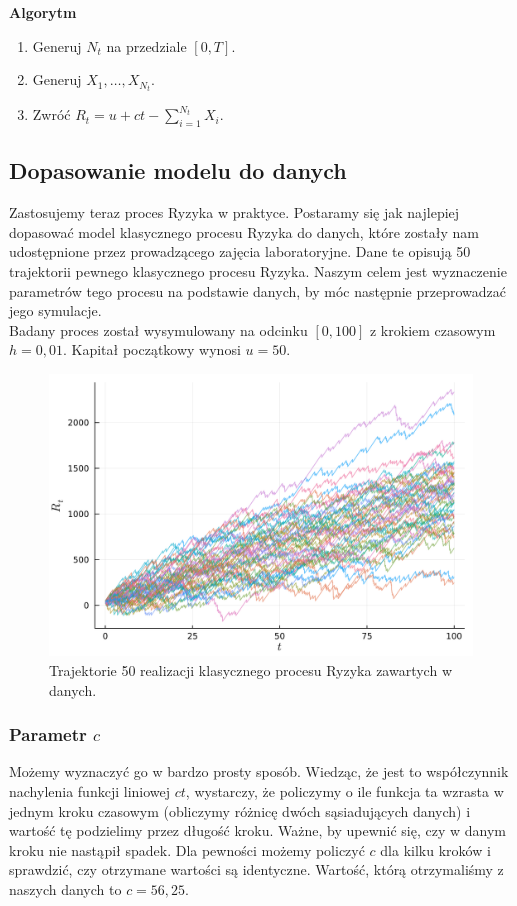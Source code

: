 \documentclass[12pt]{mwart}
\begin{document}
	\noindent \textbf{Algorytm}
	\begin{enumerate}[leftmargin=10mm]
		\item Generuj $N_t$ na przedziale $[0, T]$.
		\item Generuj $X_1, \dots, X_{N_t}$.
		\item Zwróć $R_t = u + ct - \sum\limits_{i=1}^{N_t} X_i$.
	\end{enumerate}
	
	
	
	\subsection{Dopasowanie modelu do danych}
	
	\noindent Zastosujemy teraz proces Ryzyka w praktyce. Postaramy się jak najlepiej dopasować model klasycznego procesu Ryzyka do danych, które zostały nam udostępnione przez prowadzącego zajęcia laboratoryjne. Dane te opisują 50 trajektorii pewnego klasycznego procesu Ryzyka. Naszym celem jest wyznaczenie parametrów tego procesu na podstawie danych, by móc następnie przeprowadzać jego symulacje.\vspace{1.5mm}\\
	Badany proces został wysymulowany na odcinku $[0, 100]$ z krokiem czasowym $h = 0,01$. Kapitał początkowy wynosi $u = 50$.
	
	\begin{figure}[H]
		\centering
		\includegraphics[width=\columnwidth]{fig/trajektorie_1.pdf}
		\caption{Trajektorie 50 realizacji klasycznego procesu Ryzyka zawartych w danych.}
	\end{figure}
	
	\subsubsection{Parametr {\boldmath $c$}}
	\noindent Możemy wyznaczyć go w bardzo prosty sposób. Wiedząc, że jest to współczynnik nachylenia funkcji liniowej $ct$, wystarczy, że policzymy o ile funkcja ta wzrasta w jednym kroku czasowym (obliczymy różnicę dwóch sąsiadujących danych) i wartość tę podzielimy przez długość kroku. Ważne, by upewnić się, czy w danym kroku nie nastąpił spadek. Dla pewności możemy policzyć $c$ dla kilku kroków i sprawdzić, czy otrzymane wartości są identyczne. Wartość, którą otrzymaliśmy z naszych danych to $c = 56,25$.
	
\end{document}
